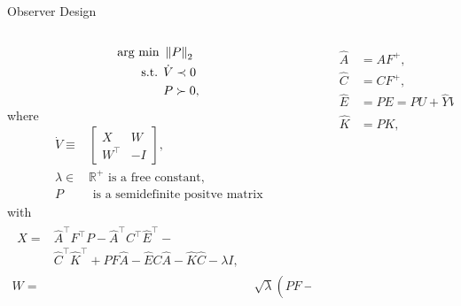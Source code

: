 \begin{slide}{Observer Design}
  \begin{columns}[c]
    \begin{column}{0.55\textwidth}
      \begin{equation}
        \begin{aligned}
          \textrm{arg min } & \left\lVert P\right\rVert_{2}    \\
          \textrm{s.t. }    & \dot{V} \prec 0 \\
                            & P \succ 0,
        \end{aligned}
      \end{equation}
      where
      \begin{align}
        \dot{V} \equiv & \begin{bmatrix}
                           X        & W  \\
                           W^{\top} & -I
                         \end{bmatrix},                                         \\
        \lambda\in     & \mathbb{R}^{+} \textrm{ is a free constant}, \nonumber \\
        P              & \textrm{ is a semidefinite positve matrix} \nonumber
      \end{align}
      with
      \begin{align}
        \begin{split}
          X = & \hat{A}^{\top}F^{\top}P - \hat{A}^{\top}C^{\top}\hat{E}^{\top} -                 \\
          & \hat{C}^{\top}\hat{K}^{\top} + PF\hat{A} - \hat{E}C\hat{A} - \hat{K}\hat{C} - \lambda{}I,
        \end{split} \\
        W = & \sqrt{\lambda}(PF - \hat{E}C).
      \end{align}
    \end{column}%
    \hfill%
    \begin{column}{0.55\textwidth}
      \begin{align}
        \begin{split}
          \hat{A} & = AF^{+},              \\
          \hat{C} & = CF^{+},              \\
          \hat{E} & = PE = PU + \hat{Y}V,  \\
          \hat{K} & = PK,                  \\

\end{split}
\end{align}
\end{column}
\end{columns}
\end{slide}
